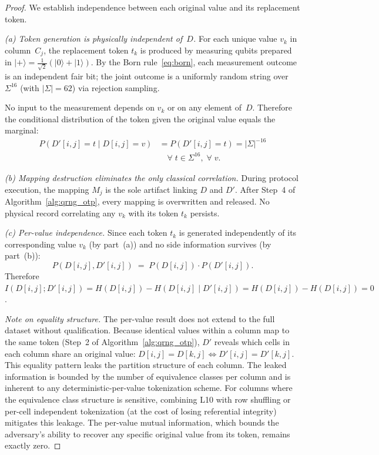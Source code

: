 \documentclass[journal]{IEEEtran}
\begin{document}
\begin{proof}
We establish independence between each original value and its replacement token.

\emph{(a) Token generation is physically independent of~$D$.}
For each unique value $v_k$ in column~$C_j$, the replacement token $t_k$ is produced by measuring qubits prepared in $|{+}\rangle = \frac{1}{\sqrt{2}}(|0\rangle + |1\rangle)$. By the Born rule~\eqref{eq:born}, each measurement outcome is an independent fair bit; the joint outcome is a uniformly random string over $\Sigma^{16}$ (with $|\Sigma|=62$) via rejection sampling.

No input to the measurement depends on $v_k$ or on any element of~$D$. Therefore the conditional distribution of the token given the original value equals the marginal:
\begin{align*}
  P(D'[i,j] {=} t \mid D[i,j] {=} v) &= P(D'[i,j] {=} t) = |\Sigma|^{-16}\\
  &\quad \forall\; t \in \Sigma^{16},\; \forall\; v.
\end{align*}

\emph{(b) Mapping destruction eliminates the only classical correlation.}
During protocol execution, the mapping $M_j$ is the sole artifact linking $D$ and $D'$. After Step~4 of Algorithm~\ref{alg:qrng_otp}, every mapping is overwritten and released. No physical record correlating any $v_k$ with its token $t_k$ persists.

\emph{(c) Per-value independence.}
Since each token $t_k$ is generated independently of its corresponding value $v_k$ (by part~(a)) and no side information survives (by part~(b)):
\[
  P(D[i,j], D'[i,j]) \;=\; P(D[i,j]) \cdot P(D'[i,j]).
\]
Therefore $I(D[i,j]; D'[i,j]) = H(D[i,j]) - H(D[i,j] \mid D'[i,j]) = H(D[i,j]) - H(D[i,j]) = 0$.

\medskip\noindent\emph{Note on equality structure.}
The per-value result does not extend to the full dataset without qualification. Because identical values within a column map to the same token (Step~2 of Algorithm~\ref{alg:qrng_otp}), $D'$ reveals which cells in each column share an original value: $D[i,j] = D[k,j] \iff D'[i,j] = D'[k,j]$. This equality pattern leaks the partition structure of each column. The leaked information is bounded by the number of equivalence classes per column and is inherent to any deterministic-per-value tokenization scheme. For columns where the equivalence class structure is sensitive, combining L10 with row shuffling or per-cell independent tokenization (at the cost of losing referential integrity) mitigates this leakage. The per-value mutual information, which bounds the adversary's ability to recover any specific original value from its token, remains exactly zero.
\end{proof}
\end{document}
